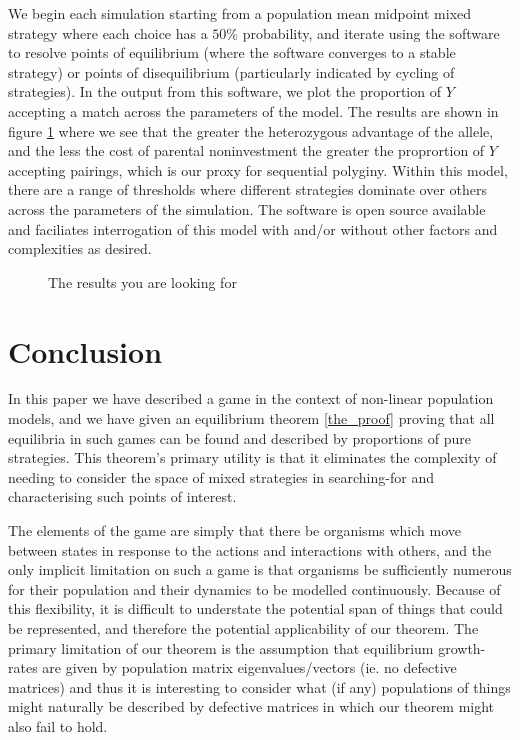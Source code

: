 We begin each simulation starting from a population mean midpoint mixed strategy where each choice has a $50\%$ probability, and iterate using the software to resolve points of equilibrium (where the software converges to a stable strategy) or points of disequilibrium (particularly indicated by cycling of strategies).
In the output from this software, we plot the proportion of $Y$ accepting a match across the parameters of the model.
The results are shown in figure \ref{fig:model_results} where we see that the greater the heterozygous advantage of the allele, and the less the cost of parental noninvestment the greater the proprortion of $Y$ accepting pairings, which is our proxy for sequential polyginy.
Within this model, there are a range of thresholds where different strategies dominate over others across the parameters of the simulation.
The software is open source available and faciliates interrogation of this model with and/or without other factors and complexities as desired.

\begin{figure}
\centering
{}
\caption{The results you are looking for}\label{fig:model_results}
\end{figure}



\section{Conclusion}\label{sec:conclusion}

In this paper we have described a game in the context of non-linear population models, and we have given an equilibrium theorem \ref{the_proof} proving that all equilibria in such games can be found and described by proportions of pure strategies. This theorem's primary utility is that it eliminates the complexity of needing to consider the space of mixed strategies in searching-for and characterising such points of interest.

The elements of the game are simply that there be organisms which move between states in response to the actions and interactions with others,
and the only implicit limitation on such a game is that organisms be sufficiently numerous for their population and their dynamics to be modelled continuously.
Because of this flexibility, it is difficult to understate the potential span of things that could be represented, and therefore the potential applicability of our theorem.
The primary limitation of our theorem is the assumption that equilibrium growth-rates are given by population matrix eigenvalues/vectors (ie. no defective matrices) and thus it is interesting to consider what (if any) populations of things might naturally be described by defective matrices in which our theorem might also fail to hold.



